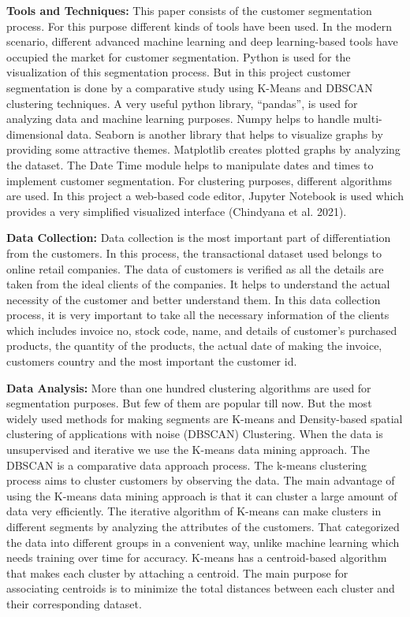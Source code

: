 \documentclass[conference]{IEEEtran}
\begin{document}
\textbf{Tools and Techniques:} This paper consists of the customer segmentation process. For this purpose different kinds of tools have been used. In the modern scenario, different advanced machine learning and deep learning-based tools have occupied the market for customer segmentation. Python is used for the visualization of this segmentation process. But in this project customer segmentation is done by a comparative study using K-Means and DBSCAN clustering techniques.  A very useful python library, “pandas”, is used for analyzing data and machine learning purposes. Numpy helps to handle multi-dimensional data. Seaborn is another library that helps to visualize graphs by providing some attractive themes. Matplotlib creates plotted graphs by analyzing the dataset. The Date Time module helps to manipulate dates and times to implement customer segmentation. For clustering purposes, different algorithms are used. In this project a web-based code editor, Jupyter Notebook is used which provides a very simplified visualized interface (Chindyana et al. 2021). 

\textbf{Data Collection:} Data collection is the most important part of differentiation from the customers. In this process, the transactional dataset used belongs to online retail companies. The data of customers is verified as all the details are taken from the ideal clients of the companies. It helps to understand the actual necessity of the customer and better understand them. In this data collection process, it is very important to take all the necessary information of the clients which includes invoice no, stock code, name, and details of customer’s purchased products, the quantity of the products, the actual date of making the invoice, customers country and the most important the customer id. 

\textbf{Data Analysis:} More than one hundred clustering algorithms are used for segmentation purposes. But few of them are popular till now. But the most widely used methods for making segments are K-means and Density-based spatial clustering of applications with noise (DBSCAN) Clustering. When the data is unsupervised and iterative we use the K-means data mining approach. The DBSCAN is a comparative data approach process. The k-means clustering process aims to cluster customers by observing the data. The main advantage of using the K-means data mining approach is that it can cluster a large amount of data very efficiently. The iterative algorithm of K-means can make clusters in different segments by analyzing the attributes of the customers. That categorized the data into different groups in a convenient way, unlike machine learning which needs training over time for accuracy. K-means has a centroid-based algorithm that makes each cluster by attaching a centroid. The main purpose for associating centroids is to minimize the total distances between each cluster and their corresponding dataset.
\end{document}
